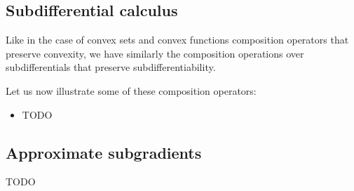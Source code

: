 \subsection{Subdifferential calculus}
\par Like in the case of convex sets and convex functions composition operators that preserve convexity, we have similarly the composition operations over subdifferentials that preserve subdifferentiability.
\par Let us now illustrate some of these composition operators:
\begin{itemize}
    \item TODO
\end{itemize}
%
\subsection{Approximate subgradients}
\par TODO
%
%
%
